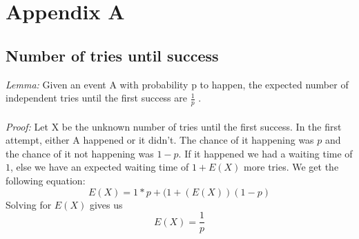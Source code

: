 \chapter{Appendix A}
\label{appendix1}
\section{Number of tries until success}
\textit{Lemma:} Given an event A with probability p to happen, the expected number of independent tries until the first success are $\frac{1}{p}$ \cite{165994}.\\\\
\textit{Proof:} Let X be the unknown number of tries until the first success. In the first attempt, either A happened or it didn't. The chance of it happening was $p$ and the chance of it not happening was $1-p$. If it happened we had a waiting time of $1$, else we have an expected waiting time of $1 + E(X)$ more tries. We get the following equation: $$E(X) = 1*p + (1 + (E(X))(1-p)$$
Solving for $E(X)$ gives us $$E(X) = \frac{1}{p}$$
